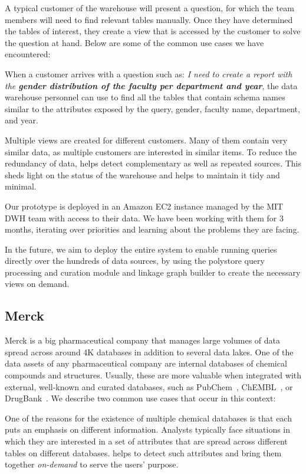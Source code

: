 A typical customer of the warehouse will present a question, for which the team
members will need to find relevant tables manually. Once they have determined
the tables of interest, they create a view that is accessed by the customer to
solve the question at hand. Below are some of the common use cases we have
encountered:

 When a customer arrives with a question such as:
\emph{I need to create a report with the \textbf{gender distribution of the
faculty per department and year}}, the data warehouse personnel can use \dcv to
find all the tables that contain schema names similar to the attributes exposed
by the query, \eg gender, faculty name, department, and year.

 Multiple views are created for different customers.
Many of them contain very similar data, as multiple customers are
interested in similar items. To reduce the redundancy of data, \dcv helps
detect complementary as well as repeated sources. This sheds light on the status
of the warehouse and helps to maintain it tidy and minimal.

Our prototype is deployed in an Amazon EC2 instance managed by the MIT DWH team
with access to their data. We have been working with them for 3 months,
iterating over priorities and learning about the problems they are facing.

In the future, we aim to deploy the entire \dcv system to enable running queries
directly over the hundreds of data sources, by using the polystore query
processing and curation module and linkage graph builder to create the necessary
views on demand. 

\subsection{Merck}

Merck is a big pharmaceutical company that manages large volumes of data spread
across around 4K databases in addition to several data lakes. 
One of the data assets of any pharmaceutical company are internal databases of
chemical compounds and structures. Usually, these are more valuable when
integrated with external, well-known and curated databases, such as
PubChem~\cite{pubchem}, ChEMBL~\cite{ChEMBL}, or DrugBank~\cite{DrugBank}. We
describe two common use cases that occur in this context:

 One of the reasons for the existence of multiple chemical
databases is that each puts an emphasis on different information. Analysts
typically face situations in which they are interested in a set of attributes
that are spread across different tables on different databases. \dcv helps to
detect such attributes and bring them together \emph{on-demand}  to serve the
users' purpose.

